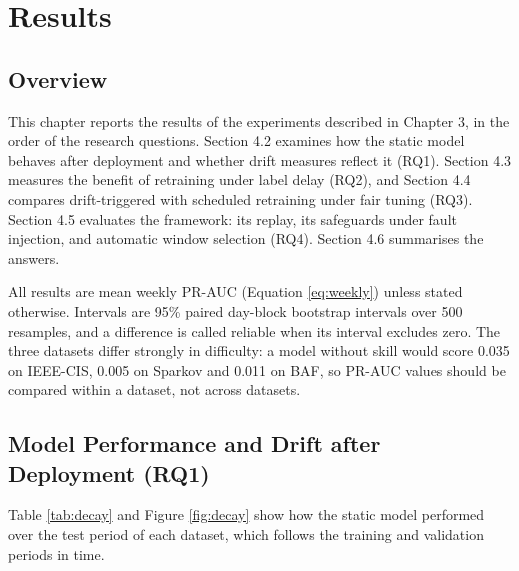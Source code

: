 \chapter{Results}

\section{Overview}

This chapter reports the results of the experiments described in Chapter 3, in the order of the research questions. Section 4.2 examines how the static model behaves after deployment and whether drift measures reflect it (RQ1). Section 4.3 measures the benefit of retraining under label delay (RQ2), and Section 4.4 compares drift-triggered with scheduled retraining under fair tuning (RQ3). Section 4.5 evaluates the framework: its replay, its safeguards under fault injection, and automatic window selection (RQ4). Section 4.6 summarises the answers.

All results are mean weekly PR-AUC (Equation \ref{eq:weekly}) unless stated otherwise. Intervals are 95\% paired day-block bootstrap intervals over 500 resamples, and a difference is called reliable when its interval excludes zero. The three datasets differ strongly in difficulty: a model without skill would score 0.035 on IEEE-CIS, 0.005 on Sparkov and 0.011 on BAF, so PR-AUC values should be compared within a dataset, not across datasets.

\section{Model Performance and Drift after Deployment (RQ1)}

Table \ref{tab:decay} and Figure \ref{fig:decay} show how the static model performed over the test period of each dataset, which follows the training and validation periods in time.

